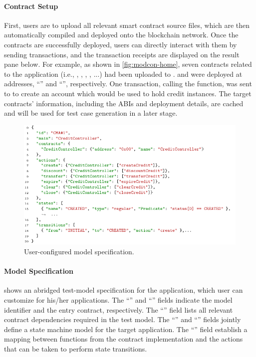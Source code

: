 \paragraph{Contract Setup}
First, users are to upload all relevant smart contract source files, which are then automatically
compiled and deployed onto the blockchain network.
Once the contracts are successfully deployed, users can directly interact with them by sending
transactions, and the transaction receipts are displayed on the result pane below.
For example, as shown in \cref{fig:modcon-home}, seven contracts related to the \wecredit
application (i.e., , , ,
, ...) had been uploaded to \modcon.
 and  were deployed at addresses,
``'' and ``'', respectively.
One transaction, calling the  function, was sent to 
to create an account which would be used to hold credit instances.
The target contracts' information, including the ABIs and deployment details, are cached and will
be used for test case generation in a later stage.

\begin{figure}[t]
	\centering
	\includegraphics[width=0.9\columnwidth,trim=0 10pt 0 10pt, clip]{Figures/Chapter3/modelSpecification.pdf}
	\caption{User-configured model specification.}
	\label{fig:specification}
\end{figure}

\paragraph{Model Specification}
 shows an abridged test-model specification for the \wecredit application, which user can customize for his/her applications.
The ``'' and ``'' fields indicate the model identifier and the entry contract,
respectively.
The ``'' field lists all relevant contract dependencies required in the test model.
The ``'' and ``'' fields jointly define a state machine model for
the target application.
The ``'' field establish a mapping between functions from the contract implementation
and the actions that can be taken to perform state transitions.

